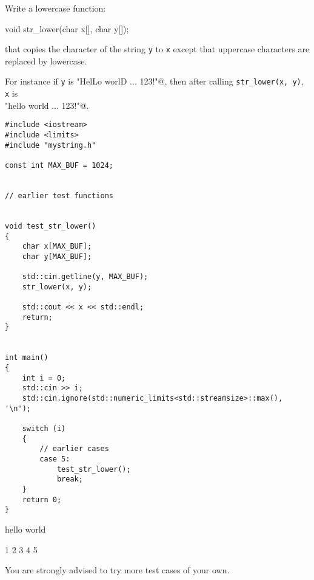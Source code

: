 Write a lowercase function:
\begin{console}
void str_lower(char x[], char y[]);
\end{console}
that
copies the character of the string \verb!y! to
\verb!x! except that
uppercase characters are replaced by
lowercase.

For instance
if \verb!y! is \verb@"HelLo worlD ... 123!"@,
then after calling
\verb!str_lower(x, y)!, 
\verb!x! is
\\
\verb@"hello world ... 123!"@.

{\small
\begin{Verbatim}[frame=single,commandchars=\~\!\@]
#include <iostream>
#include <limits>
#include "mystring.h"

const int MAX_BUF = 1024;


// earlier test functions


void test_str_lower()
{
    char x[MAX_BUF];
    char y[MAX_BUF];

    std::cin.getline(y, MAX_BUF);
    str_lower(x, y);
    
    std::cout << x << std::endl;
    return;
}


int main()
{
    int i = 0;
    std::cin >> i;
    std::cin.ignore(std::numeric_limits<std::streamsize>::max(), '\n');

    switch (i)
    {
        // earlier cases
        case 5:
            test_str_lower();
            break;
    }
    return 0;
}
\end{Verbatim}
}

\resett

\nextt
\begin{console}[fontsize=\small,commandchars=\\\{\}]
hello world
\end{console}

\nextt
\begin{console}[fontsize=\small,commandchars=\\\{\}]
1 2 3 4 5
\end{console}

You are strongly advised to try more test cases of your own.
